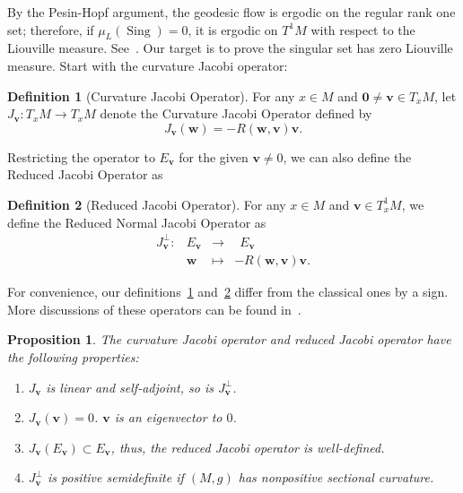 \documentclass[reqno,11pt]{article}
\newtheorem{proposition}{Proposition}[section]
\theoremstyle{definition}
\newtheorem{definition}{Definition}[section]
\theoremstyle{remark}
\numberwithin{equation}{section}
\DeclareMathOperator{\sing}{Sing}
\begin{document}
By the Pesin-Hopf argument, the geodesic flow is ergodic on the regular rank one set; therefore, if $\mu_L(\sing)=0$, it is ergodic on $T^{1}M$ with respect to the Liouville measure. See~\cite{BallmannBrin1982,Burns1983,BurnsMatveev2021, Pesin1977}. Our target is to prove the singular set has zero Liouville measure. Start with the curvature Jacobi operator:

\begin{definition}[Curvature Jacobi Operator]\label{def_5_1}
	For any $x\in M$ and $\bm{0}\neq\bm{v}\in T_{x}M$, let $J_{\bm{v}}:T_{x}M \to T_{x}M$ denote the Curvature Jacobi Operator defined by
	\begin{displaymath}
		J_{\bm{v}}(\bm{w})=-R(\bm{w},\bm{v})\bm{v}.
	\end{displaymath}
\end{definition}

Restricting the operator to $E_{\bm{v}}$ for the given $\bm{v}\neq 0$, we can also define the Reduced Jacobi Operator as

\begin{definition}[Reduced Jacobi Operator]\label{def_5_2}
	For any $x\in M$ and $\bm{v}\in T^{1}_{x}M$, we define the Reduced Normal Jacobi Operator as
	\begin{displaymath}
		\begin{aligned}
			J^{\perp}_{\bm{v}}: & E_{\bm{v}} & \longrightarrow & ~~E_{\bm{v}}             \\
			                    & \bm{w}     & \longmapsto     & -R(\bm{w},\bm{v})\bm{v}.
		\end{aligned}
	\end{displaymath}
\end{definition}

For convenience, our definitions~\ref{def_5_1} and~\ref{def_5_2} differ from the classical ones by a sign. More discussions of these operators can be found in~\cite{BlazicGilkeyNikcevicSimon2006,Gilkey2001}.

\begin{proposition}
	The curvature Jacobi operator and reduced Jacobi operator have the following properties:
	\begin{enumerate}
		\item $J_{\bm{v}}$ is linear and self-adjoint, so is $J^{\perp}_{\bm{v}}$.
		\item $J_{\bm{v}}(\bm{v})=0$. $\bm{v}$ is an eigenvector to $0$.
		\item $J_{\bm{v}}(E_{\bm{v}})\subset E_{\bm{v}}$, thus, the reduced Jacobi operator is well-defined.
		\item $J^{\perp}_{\bm{v}}$ is positive semidefinite if $(M,g)$ has nonpositive sectional curvature.
	\end{enumerate}
\end{proposition}
\end{document}
